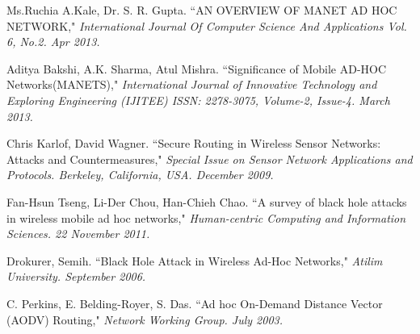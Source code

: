\documentclass[conference,12pt]{IEEEtran}
\begin{document}
\begin{thebibliography}{88}
\vspace{-0.02in}


Ms.Ruchia A.Kale, Dr. S. R. Gupta.
``AN OVERVIEW OF MANET AD HOC
NETWORK,"
{\em International Journal Of Computer Science And Applications Vol. 6, No.2. Apr 2013.}

Aditya Bakshi, A.K. Sharma, Atul Mishra.
``Significance of Mobile AD-HOC Networks(MANETS),"
{\em International Journal of Innovative Technology and Exploring Engineering (IJITEE)
ISSN: 2278-3075, Volume-2, Issue-4. March 2013.}

Chris Karlof, David Wagner.
``Secure Routing in Wireless Sensor Networks:
Attacks and Countermeasures,"
{\em Special Issue on Sensor Network Applications and Protocols. Berkeley, California, USA. December 2009.}

Fan-Hsun Tseng, Li-Der Chou, Han-Chieh Chao.
``A survey of black hole attacks in wireless mobile ad hoc networks,"
{\em Human-centric Computing and Information Sciences. 22 November 2011.}

Drokurer, Semih.
``Black Hole Attack in Wireless Ad-Hoc Networks,"
{\em Atilim University. September 2006.}

C. Perkins, E. Belding-Royer, S. Das.
``Ad hoc On-Demand Distance Vector (AODV) Routing,"
{\em Network Working Group. July 2003.}




\end{thebibliography}
\end{document}
